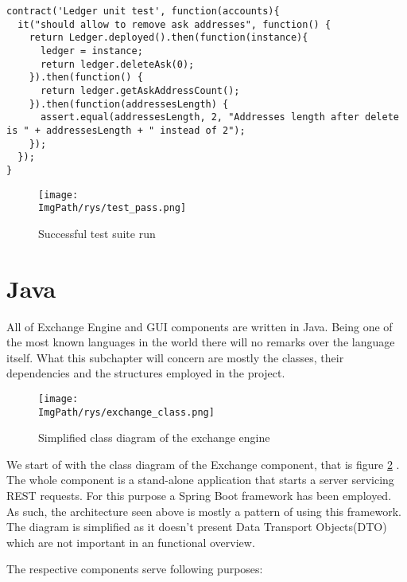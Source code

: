 \documentclass[a4paper,12pt,twoside,openany]{report}
\newcommand{\ImgPath}{.}
\begin{document}
\begin{lstlisting}
contract('Ledger unit test', function(accounts){
  it("should allow to remove ask addresses", function() {
    return Ledger.deployed().then(function(instance){
      ledger = instance;
      return ledger.deleteAsk(0);
    }).then(function() {
      return ledger.getAskAddressCount();
    }).then(function(addressesLength) {
      assert.equal(addressesLength, 2, "Addresses length after delete is " + addressesLength + " instead of 2");
    });
  });
}
\end{lstlisting}

\begin{figure}[!htbp]
	\begin{center}
\centering
\texttt{[image: \\ImgPath/rys/test\_pass.png]}
\end{center}
	\caption{Successful test suite run}
	\label{tests}
\end{figure}

\newpage

\section{Java}

All of Exchange Engine and GUI components are written in Java. Being one of the most known languages in the world there will no remarks over the language itself. What this subchapter will concern are mostly the classes, their dependencies and the structures employed in the project.

\begin{figure}[!htbp]
	\begin{center}
\centering
\texttt{[image: \\ImgPath/rys/exchange\_class.png]}
\end{center}
	\caption{Simplified class diagram of the exchange engine}
	\label{engine class}
\end{figure}

We start of with the class diagram of the Exchange component, that is figure \ref{engine class} . The whole component is a stand-alone application that starts a server servicing REST requests. For this purpose a Spring Boot framework has been employed. As such, the architecture seen above is mostly a pattern of using this framework. The diagram is simplified as it doesn't present Data Transport Objects(DTO) which are not important in an functional overview.

The respective components serve following purposes:
\end{document}
